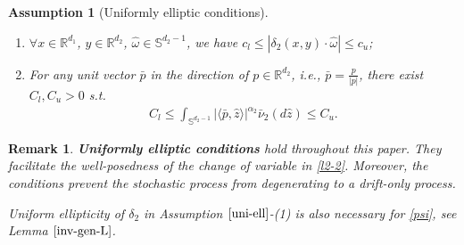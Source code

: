 \documentclass[11pt,reqno]{amsart}
\newtheorem{assumption}{\indent Assumption}[section]
\newtheorem{remark}{\indent Remark}[section]
\numberwithin{equation}{section}
\newcommand{\R}{\mathbb{R}}
\newcommand{\s}{\mathbb{S}}
\newcommand{\om}{\omega}
\newcommand{\de}{\delta}
\newcommand{\mb}{\mathbb}
\begin{document}
\begin{assumption}[Uniformly elliptic conditions]\label{uni-ell}
	\
\begin{enumerate}
\item  $\forall x\in\R^{d_{1}}$, $ y\in\R^{d_{2}}$, $ \hat{\om}\in\s^{d_{2}-1}$, we have  %
$c_l\le|\de_2(x,y)\cdot \hat{\om}|\le c_u$;

\item  For any unit vector $\bar{p}$ in the direction of $p\in\mathbb{R}^{d_{2}}$, i.e., $\bar{p}=\frac{p}{|p|}$, there exist $C_{l},C_{u}>0$ s.t.
\begin{align*}
	C_{l}\leq\int_{\mathbb{S}^{d_{2}-1}}|\langle\bar{p},\hat{z}\rangle|^{\alpha_{2}}\bar{\nu}_{2}(d\hat{z})\leq C_{u}.
\end{align*}
\end{enumerate}
\end{assumption}
\begin{remark}
\textbf{Uniformly elliptic conditions} hold throughout this paper. They facilitate the well-posedness of the change of variable in \eqref{l2-2}. Moreover, the conditions %
 prevent the stochastic process from degenerating to a drift-only process. %


Uniform ellipticity of $\de_{2}$ in Assumption $\ref{uni-ell}$-(1) is also necessary for \eqref{psi}, see Lemma $\ref{inv-gen-L}$.

\end{remark}
\end{document}
